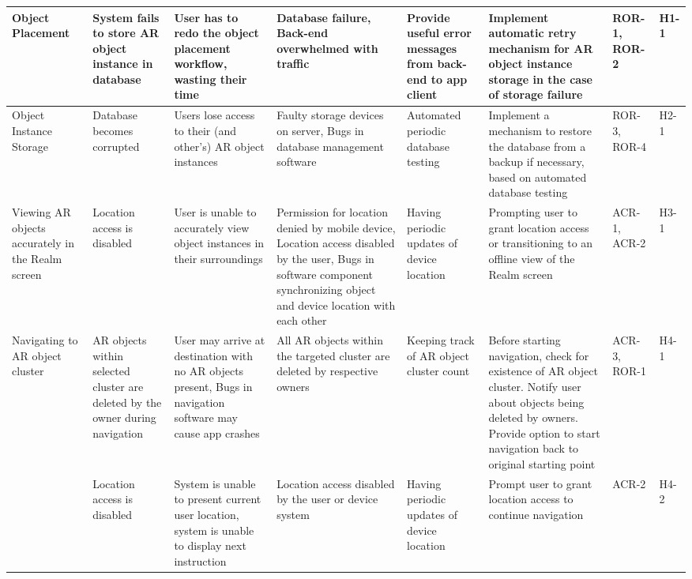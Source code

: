 \documentclass{article}
\begin{document}
\begin{landscape}
\begin{table}[hp]
\begin{footnotesize}
\begin{tabular}{|p{1in}|p{1in}|p{1.5in}|p{1.5in}|p{1.5in}|p{2in}|p{0.4in}|p{0.4in}|}
        \hline
        Object Placement & System fails to store AR object instance in database & User has to redo the object placement workflow, wasting their time & Database failure, Back-end overwhelmed with traffic & Provide useful error messages from back-end to app client & Implement automatic retry mechanism for AR object instance storage in the case of storage failure & ROR-1, ROR-2 & H1-1\\
        \hline
        Object Instance Storage & Database becomes corrupted & Users lose access to their (and other's) AR object instances & Faulty storage devices on server, Bugs in database management software & Automated periodic database testing & Implement a mechanism to restore the database from a backup if necessary, based on automated database testing & ROR-3, ROR-4 & H2-1 \\
        \hline
        Viewing AR objects accurately in the Realm screen & Location access is disabled & User is unable to accurately view object instances in their surroundings & Permission for location denied by mobile device, Location access disabled by the user, Bugs in software component synchronizing object and device location with each other & Having periodic updates of device location & Prompting user to grant location access or transitioning to an offline view of the Realm screen & ACR-1, ACR-2 & H3-1 \\
        \hline
        Navigating to AR object cluster & AR objects within selected cluster are deleted by the owner during navigation & User may arrive at destination with no AR objects present, Bugs in navigation software may cause app crashes & All AR objects within the targeted cluster are deleted by respective owners & Keeping track of AR object cluster count & Before starting navigation, check for existence of AR object cluster. Notify user about objects being deleted by owners. Provide option to start navigation back to original starting point & ACR-3, ROR-1 & H4-1 \\
        & Location access is disabled & System is unable to present current user location, system is unable to display next instruction & Location access disabled by the user or device system & Having periodic updates of device location & Prompt user to grant location access to continue navigation & ACR-2 & H4-2 \\
        \hline
    \end{tabular}
    \end{footnotesize}
\end{table}
\end{landscape}
\restoregeometry
\end{document}
